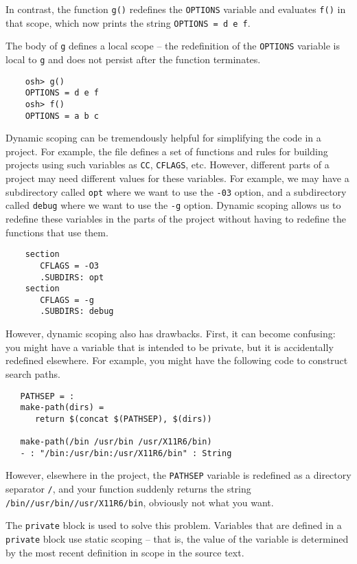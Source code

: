 In contrast, the function \verb+g()+ redefines the \verb+OPTIONS+
variable and evaluates \verb+f()+ in that scope, which now prints the
string \verb+OPTIONS = d e f+.

The body of \verb+g+ defines a local scope -- the redefinition of the
\verb+OPTIONS+ variable is local to \verb+g+ and does not persist
after the function terminates.

\begin{verbatim}
    osh> g()
    OPTIONS = d e f
    osh> f()
    OPTIONS = a b c
\end{verbatim}

Dynamic scoping can be tremendously helpful for simplifying the code
in a project.  For example, the  file defines a set of
functions and rules for building projects using such variables as
\verb+CC+, \verb+CFLAGS+, etc.  However, different parts of a project
may need different values for these variables.  For example, we may
have a subdirectory called \verb+opt+ where we want to use the
\verb+-03+ option, and a subdirectory called \verb+debug+ where we
want to use the \verb+-g+ option.  Dynamic scoping allows us to redefine
these variables in the parts of the project without having to
redefine the functions that use them.

\begin{verbatim}
    section
       CFLAGS = -O3
       .SUBDIRS: opt
    section
       CFLAGS = -g
       .SUBDIRS: debug
\end{verbatim}

However, dynamic scoping also has drawbacks.  First, it can become
confusing: you might have a variable that is intended to be private,
but it is accidentally redefined elsewhere.  For example, you might
have the following code to construct search paths.

\begin{verbatim}
   PATHSEP = :
   make-path(dirs) =
      return $(concat $(PATHSEP), $(dirs))

   make-path(/bin /usr/bin /usr/X11R6/bin)
   - : "/bin:/usr/bin:/usr/X11R6/bin" : String
\end{verbatim}

However, elsewhere in the project, the \verb+PATHSEP+ variable is
redefined as a directory separator \verb+/+, and your function
suddenly returns the string \verb+/bin//usr/bin//usr/X11R6/bin+,
obviously not what you want.

The \verb+private+ block is used to solve this problem.  Variables
that are defined in a \verb+private+ block use static scoping -- that
is, the value of the variable is determined by the most recent
definition in scope in the source text.

